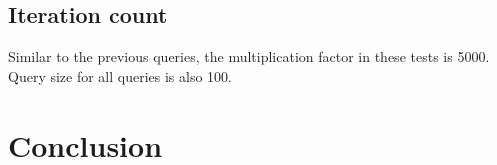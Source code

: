 \subsection{Iteration count}
\label{subsec:iteration-count}

Similar to the previous queries, the multiplication factor in these tests is 5000.
Query size for all queries is also 100.

\section{Conclusion}
\label{sec:empirical-study-conclusion}

